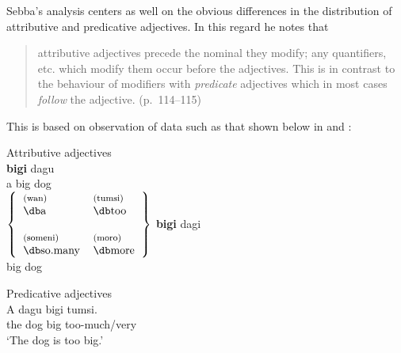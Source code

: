 Sebba’s analysis centers as well on the obvious differences in the
distribution of attributive and predicative adjectives.  In this
regard he notes that

\begin{quote}
attributive adjectives precede the nominal they modify; any
quantifiers, etc. which modify them occur before the adjectives.  This
is in contrast to the behaviour of modifiers with \textit{predicate}
adjectives which in most cases \textit{follow} the adjective. (p.~114--115)\end{quote}

This is based on observation of data such as that shown below in
 and :

\ea%
\label{ex:3:6}
Attributive adjectives \citep[115]{Sebba1986}\\
 \ea
  \textbf{bigi}  {dagu}\\
       a big dog\\

  \ex 
  $\left\{ 
	  \begin{tabular}{ll}
	  \exfont (wan) & \exfont (tumsi)\\
	  {\db}a & {\db}too \\
	  \\
	  \exfont (someni) &\exfont (moro)\\
	  {\db}so.many & {\db}more \\
	  \end{tabular}
  \right\}$
  \gll \textbf{bigi} dagi\\
  big dog\\
  \z
\z


\ea%
\label{ex:3:7}
Predicative adjectives \citep[115]{Sebba1986}\\
\ea
\gll A dagu bigi tumsi.\\
     the dog big too-much\slash very\\
\glt `The dog is too big.'

\z
\z

